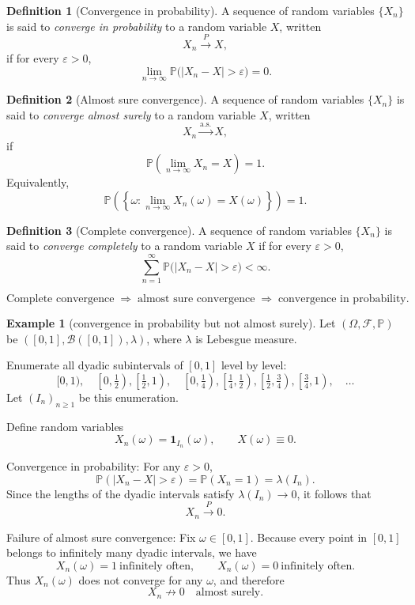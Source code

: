\documentclass[11pt]{article}
\theoremstyle{definition}
\newtheorem{defn}{Definition}[section]
\newtheorem{exmp}{Example}[section]
\begin{document}
\begin{defn}[Convergence in probability]
A sequence of random variables $\{X_n\}$ is said to \emph{converge in probability} to a random variable $X$, written
\[
X_n \xrightarrow{P} X,
\]
if for every $\varepsilon > 0$,
\[
\lim_{n \to \infty} \mathbb{P}\bigl( |X_n - X| > \varepsilon \bigr) = 0.
\]
\end{defn}
\begin{defn}[Almost sure convergence]
A sequence of random variables $\{X_n\}$ is said to \emph{converge almost surely} to a random variable $X$, written
\[
X_n \xrightarrow{\text{a.s.}} X,
\]
if
\[
\mathbb{P}\left( \lim_{n \to \infty} X_n = X \right) = 1.
\]
Equivalently,
\[
\mathbb{P}\left( \left\{ \omega : \lim_{n \to \infty} X_n(\omega) = X(\omega) \right\} \right) = 1.
\]
\end{defn}
\begin{defn}[Complete convergence]
A sequence of random variables $\{X_n\}$ is said to \emph{converge completely} to a random variable $X$ if for every $\varepsilon > 0$,
\[
\sum_{n=1}^{\infty} \mathbb{P}\bigl( |X_n - X| > \varepsilon \bigr) < \infty.
\]

\[
\text{Complete convergence} \;\Longrightarrow\; \text{almost sure convergence}
\;\Longrightarrow\; \text{convergence in probability}.
\]
\end{defn}

\begin{exmp} [convergence in probability but not almost surely]
Let $(\Omega,\mathcal F,\mathbb P)$ be $([0,1],\mathcal B([0,1]),\lambda)$,
where $\lambda$ is Lebesgue measure.

Enumerate all dyadic subintervals of $[0,1]$ level by level:
\[
[0,1),\quad
\left[0,\tfrac12\right),\left[\tfrac12,1\right),\quad
\left[0,\tfrac14\right),\left[\tfrac14,\tfrac12\right),
\left[\tfrac12,\tfrac34\right),\left[\tfrac34,1\right),\quad \dots
\]
Let $(I_n)_{n\ge1}$ be this enumeration.

Define random variables
\[
X_n(\omega) = \mathbf 1_{I_n}(\omega), 
\qquad
X(\omega) \equiv 0.
\]

Convergence in probability: For any $\varepsilon>0$,
\[
\mathbb P(|X_n - X| > \varepsilon)
= \mathbb P(X_n = 1)
= \lambda(I_n).
\]
Since the lengths of the dyadic intervals satisfy $\lambda(I_n)\to 0$,
it follows that
\[
X_n \xrightarrow{P} 0.
\]

Failure of almost sure convergence: Fix $\omega\in[0,1]$.
Because every point in $[0,1]$ belongs to infinitely many dyadic intervals,
we have
\[
X_n(\omega) = 1 \ \text{infinitely often}, 
\qquad
X_n(\omega) = 0 \ \text{infinitely often}.
\]
Thus $X_n(\omega)$ does not converge for any $\omega$, and therefore
\[
X_n \not\to 0 \quad \text{almost surely}.
\]

\end{exmp}
\end{document}
